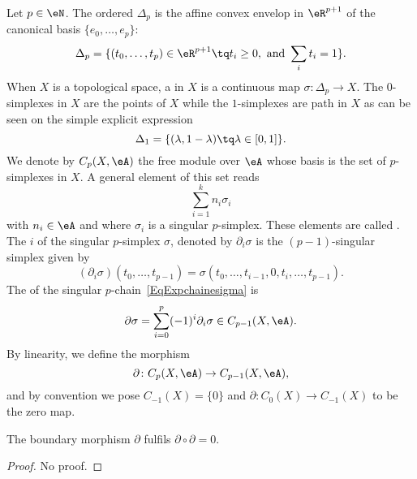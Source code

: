Let $p\in\eN$. The ordered  $\Delta_p$ is the affine convex envelop in $\eR^{p+1}$ of the canonical basis $\{ e_0,\ldots,e_p \}$:
\begin{equation}
	\Delta_p=\{ (t_0,\ldots,t_p)\in\eR^{p+1}\tq t_i\geq 0,\text{ and }\sum_it_i=1 \}.
\end{equation}
When $X$ is a topological space, a  in $X$ is a continuous map $\sigma\colon \Delta_p\to X$. The $0$-simplexes in $X$ are the points of $X$ while the $1$-simplexes are path in $X$ as can be seen on the simple explicit expression
\[
	\Delta_1=\{ (\lambda,1-\lambda)\tq\lambda\in[0,1] \}.
\]
We denote by $C_p(X,\eA)$ the free module over $\eA$ whose basis is the set of $p$-simplexes in $X$. A general element of this set reads
\begin{equation}		\label{EqExpchainesigma}
	\sum_{i=1}^kn_i\sigma_i
\end{equation}
with $n_i\in\eA$ and where $\sigma_i$ is a singular $p$-simplex. These elements are called . The  $i$ of the singular $p$-simplex $\sigma$, denoted by $\partial_i\sigma$ is the $(p-1)$-singular simplex given by
\[
	(\partial_i\sigma)(t_0,\ldots,t_{p-1})=\sigma(t_0,\ldots,t_{i-1},0,t_i,\ldots,t_{p-1}).
\]
The  of the singular $p$-chain~\ref{EqExpchainesigma} is
\begin{equation}
	\partial\sigma=\sum_{i=0}^p(-1)^i\partial_i\sigma\in C_{p-1}(X,\eA).
\end{equation}
By linearity, we define the morphism
\begin{equation}
	\partial\colon C_{p}(X,\eA)\to C_{p-1}(X,\eA),
\end{equation}
and by convention we pose $C_{-1}(X)=\{ 0 \}$ and $\partial\colon C_0(X)\to C_{-1}(X)$ to be the zero map.

\begin{lemma}
	The boundary morphism $\partial$ fulfils $\partial\circ\partial =0$.
\end{lemma}

\begin{proof}
	No proof.
\end{proof}

